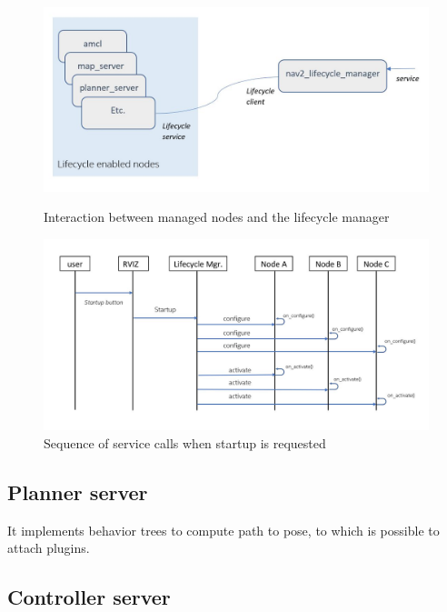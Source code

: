\begin{figure}[h]
    \centering
    \begin{minipage}[h]{0.45\textwidth}
        \centering
        \includegraphics[width=\textwidth]{images/diagram_lifecycle_manager}
        \caption{Interaction between managed nodes and the lifecycle manager}
    \end{minipage}
    \hfill  
    \begin{minipage}[h]{0.45\textwidth}
        \centering
        \includegraphics[width=\textwidth]{images/uml_lifecycle_manager}
        \caption{Sequence of service calls when startup is requested}
    \end{minipage}
\end{figure}

\subsection*{Planner server}

It implements behavior trees to compute path to pose, to which is possible to attach plugins.

\subsection*{Controller server}

